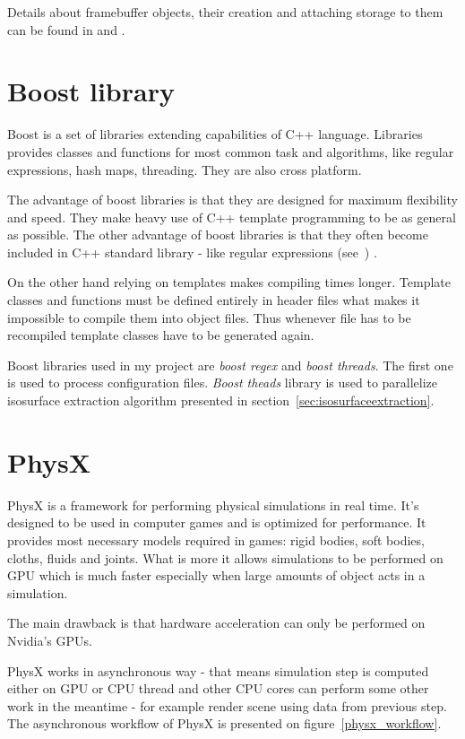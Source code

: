Details about framebuffer objects, their creation and attaching storage to them can be found in \cite[chapter~8]{OpenGLSuperbible} and \cite[chapter~10]{RedBook}.

\section{Boost library}
Boost is a set of libraries extending capabilities of C++ language. Libraries provides classes and functions for most common task and algorithms, like regular expressions, hash maps, threading. They are also cross platform. 

The advantage of boost libraries is that they are designed for maximum flexibility and speed. They make heavy use of C++ template programming to be as general as possible. The other advantage of boost libraries is that they often become included in C++ standard library - like regular expressions (see~\cite{CppRef}) . 

On the other hand relying on templates makes compiling times longer. Template classes and functions must be defined entirely in header files what makes it impossible to compile them into object files. Thus whenever file has to be recompiled template classes have to be generated again.

Boost libraries used in my project are \textit{boost regex} and \textit{boost threads}. The first one is used to process configuration files. \textit{Boost theads} library is used to parallelize isosurface extraction algorithm presented in section~\ref{sec:isosurfaceextraction}.

\section{PhysX}

PhysX is a framework for performing physical simulations in real time. It's designed to be used in computer games and is optimized for performance. It provides most necessary models required in games: rigid bodies, soft bodies, cloths, fluids and joints. What is more it allows simulations to be performed on GPU which is much faster especially when large amounts of object acts in a simulation.

The main drawback is that hardware acceleration can only be performed on Nvidia's GPUs. 

PhysX works in asynchronous way - that means simulation step is computed either on GPU or CPU thread and other CPU cores can perform some other work in the meantime - for example render scene using data from previous step. The asynchronous workflow of PhysX is presented on figure~\ref{physx_workflow}.

